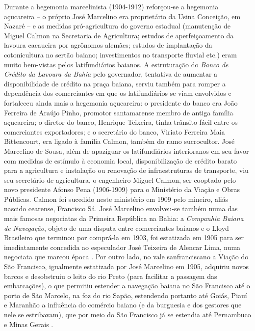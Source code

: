 Durante a hegemonia marcelinista (1904-1912) reforçou-se a hegemonia açucareira -- o próprio José Marcelino era proprietário da Usina Conceição, em Nazaré -- e as medidas pró-agricultura do governo estadual (manutenção de Miguel Calmon na Secretaria de Agricultura; estudos de aperfeiçoamento da lavoura cacaueira por agrônomos alemães; estudos de implantação da cotonicultura no sertão baiano; investimentos no transporte fluvial etc.) eram muito bem-vistas pelos latifundiários baianos. A estruturação do \textit{Banco de Crédito da Lavoura da Bahia} pelo governador, tentativa de aumentar a disponibilidade de crédito na praça baiana, serviu também para romper a dependência dos comerciantes em que os latifundiários se viam envolvidos e fortaleceu ainda mais a hegemonia açucareira: o presidente do banco era João Ferreira de Araújo Pinho, promotor santamarense membro de antiga família açucareira; o diretor do banco, Henrique Teixeira, tinha trânsito fácil entre os comerciantes exportadores; e o secretário do banco, Viriato Ferreira Maia Bittencourt, era ligado à família Calmon, também do ramo sucrocultor. José Marcelino de Sousa, além de apaziguar os latifundiários interioranos em seu favor com medidas de estímulo à economia local, disponibilização de crédito barato para a agricultura e instalação ou renovação de infraestruturas de transporte, viu seu secretário de agricultura, o engenheiro Miguel Calmon, ser cooptado pelo novo presidente Afonso Pena (1906-1909) para o Ministério da Viação e Obras Públicas. Calmon foi sucedido neste ministério em 1909 pelo mineiro, aliás nascido cearense, Francisco Sá. José Marcelino envolveu-se também numa das mais famosas negociatas da Primeira República na Bahia: a \textit{Companhia Baiana de Navegação}, objeto de uma disputa entre comerciantes baianos e o Lloyd Brasileiro que terminou por comprá-la em 1903, foi estatizada em 1905 para ser imediatamente concedida ao especulador José Teixeira de Alencar Lima, numa negociata que marcou época \cite[p.~220]{CUNHA2011}. Por outro lado, no vale sanfranciscano a Viação do São Francisco, igualmente estatizada por José Marcelino em 1905, adquiriu novos barcos e desobstruiu o leito do rio Preto (para facilitar a passagem das embarcações), o que permitiu estender a navegação baiana no São Francisco até o porto de São Marcelo, na foz do rio Sapão, estendendo portanto até Goiás, Piauí e Maranhão a influência do comércio baiano (e da burguesia e dos gestores que nele se estribavam), que por meio do São Francisco já se estendia até Pernambuco e Minas Gerais \cite[p.~220-221]{CUNHA2011}.

